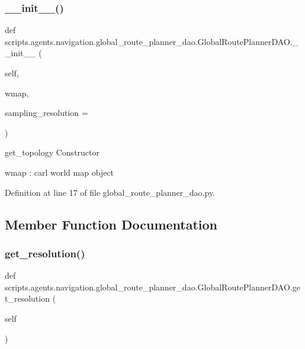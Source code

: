 \subsubsection{\texorpdfstring{\+\_\+\+\_\+init\+\_\+\+\_\+()}{\_\_init\_\_()}}
{\footnotesize\ttfamily def scripts.\+agents.\+navigation.\+global\+\_\+route\+\_\+planner\+\_\+dao.\+Global\+Route\+Planner\+D\+A\+O.\+\_\+\+\_\+init\+\_\+\+\_\+ (\begin{DoxyParamCaption}\item[{}]{self,  }\item[{}]{wmap,  }\item[{}]{sampling\+\_\+resolution = {} }\end{DoxyParamCaption})}

\begin{DoxyVerb}get_topology
Constructor

wmap    :   carl world map object
\end{DoxyVerb}
 

Definition at line 17 of file global\+\_\+route\+\_\+planner\+\_\+dao.\+py.



\subsection{Member Function Documentation}
\mbox{\label{classscripts_1_1agents_1_1navigation_1_1global__route__planner__dao_1_1GlobalRoutePlannerDAO_a40ee35519bc601af9469dcf0b5fe57f4}} 
\subsubsection{\texorpdfstring{get\+\_\+resolution()}{get\_resolution()}}
{\footnotesize\ttfamily def scripts.\+agents.\+navigation.\+global\+\_\+route\+\_\+planner\+\_\+dao.\+Global\+Route\+Planner\+D\+A\+O.\+get\+\_\+resolution (\begin{DoxyParamCaption}\item[{}]{self }\end{DoxyParamCaption})}

